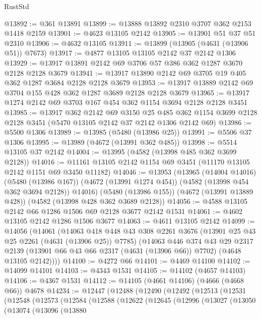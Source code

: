 \begin{lexlean}{RustStd}
\begin{coremodule}
{\begin{coremodule}
{{{{{{{{{{{{{{{{@13892 := @361 @13891
@13899 := @13888 @13892 @2310 @3707 @362 @2153 @1418 @2159
@13901 := @4623 @13105 @2142
@13905 := @13901 @51 @37 @51 @2310
@13906 := @4632 @13105
@13911 := @13899 (@13905 (@4631 (@13906 @51)) @7673)
@13917 := @4877 @13105 @13105 @2142 @37 @2142 @1306
@13929 := @13917 @13891 @2142 @69 @3706 @57 @386 @362 @1287 @3670 @2128 @2128 @3679
@13941 := @13917 @13890 @2142 @69 @3705 @19 @405 @362 @1287 @3684 @2128 @2128 @3679
@13953 := @13917 @13889 @2142 @69 @3704 @155 @428 @362 @1287 @3689 @2128 @2128 @3679
@13965 := @13917 @1274 @2142 @69 @3703 @167 @454 @362 @1154 @3694 @2128 @2128 @3451
@13985 := @13917
    @362
    @2142
    @69
    @3150
    @25
    @485
    @362
    @1154
    @3699
    @2128
    @2128
    @3451
    (@5470 @13105 @2142 @37 @2142 @1306 @2142 @69)
@13986 := @5500 @1306
@13989 := @13985 (@5480 (@13986 @25))
@13991 := @5506 @37 @1306
@13995 := @13989 (@4672 (@13991 @362 @485))
@13998 := @5514 @13105 @37 @2142
@14004 := @13995 (@4582 (@13998 @485 @362 @3699 @2128))
@14016 := @11161 @13105 @2142 @1154 @69 @3451 (@11170 @13105 @2142 @1151 @69 @3450 @11182)
@14046 := @13953
    (@13965
      (@14004 @14016)
      (@5480 (@13986 @167))
      (@4672 (@13991 @1274 @454))
      (@4582 (@13998 @454 @362 @3694 @2128))
      @14016)
    (@5480 (@13986 @155))
    (@4672 (@13991 @13889 @428))
    (@4582 (@13998 @428 @362 @3689 @2128))
@14056 := @4588 @13105 @2142 @66 @1286 @1506 @69 @2128 @3677 @2142 @1531
@14061 := @4602 @13105 @2142 @1286 @1506 @3677
@14063 := @4611 @13105 @2142
@14099 := @14056
    (@14061
      (@14063
        @418
        @448
        @43
        @308
        @2261
        @3676
        (@13901 @25 @43 @25 @2261 (@4631 (@13906 @25)) @7785)
        (@14063
          @446
          @374
          @43
          @29
          @2317
          @2139
          (@13901 @66 @43 @66 @2317 (@4631 (@13906 @66)) @7702)
          (@4648 @13105 @2142))))
@14100 := @4272 @66
@14101 := @4469 @14100
@14102 := @14099 @14101
@14103 := @4343 @1531
@14105 := @14102 (@4657 @14103)
@14106 := @4367 @1531
@14112 := @14105 (@4661 @14106) (@4666 (@4668 @66)) @4678
@14234 := @12447
    (@12488
      (@12490
        (@12492
          (@12513
            (@12531
              (@12548
                (@12573
                  (@12584
                    (@12588
                      (@12622
                        (@12645
                          (@12996
                            (@13027
                              (@13050
                                (@13074
                                  (@13096
                                    (@13880
}}}}}}}}}}}}}}}}
\end{coremodule}}
\end{coremodule}
\end{lexlean}
